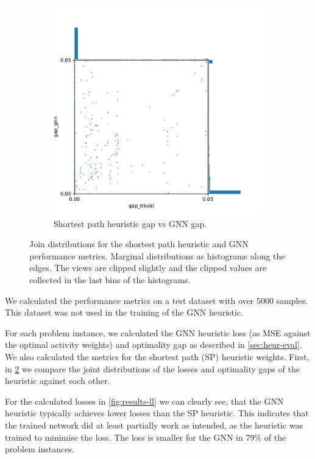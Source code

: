 \documentclass[english, 12pt, a4paper, sci, utf8, a-2b, online]{aaltothesis}
\begin{document}
\begin{figure}[b]
\begin{subfigure}{0.5\textwidth}
        \includegraphics[width=\linewidth]{figures/gap-gap.pdf}
        \caption{Shortest path heuristic gap vs GNN gap.}
        \label{fig:results-gg}
    \end{subfigure}
    \caption{Join distributions for the shortest path heuristic and GNN performance metrics. Marginal distributions as histograms along the edges. The views are clipped slightly and the clipped values are collected in the last bins of the histograms.}
    \label{fig:results-ll-gg}
\end{figure}

We calculated the performance metrics on a test dataset with over 5000 samples. This dataset was not used in the training of the GNN heuristic.

For each problem instance, we calculated the GNN heuristic loss (as MSE against the optimal activity weights) and optimality gap as described in \cref{sec:heur-eval}. We also calculated the metrics for the shortest path (SP) heuristic weights. First, in \cref{fig:results-ll-gg} we compare the joint distributions of the losses and optimality gaps of the heuristic against each other.

For the calculated losses in \cref{fig:results-ll} we can clearly see, that the GNN heuristic typically achieves lower losses than the SP heuristic. This indicates that the trained network did at least partially work as intended, as the heuristic was trained to minimise the loss. The loss is smaller for the GNN in 79\% of the problem instances.
\end{document}
